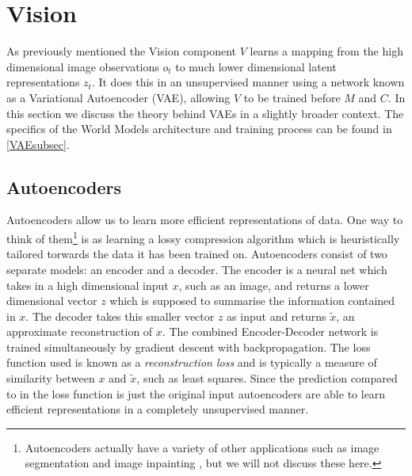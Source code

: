 \documentclass{article}
\numberwithin{figure}{section}
\theoremstyle{definition}
\begin{document}



\section{Vision}
As previously mentioned the Vision component $V$ learns a mapping from the high dimensional image observations $o_t$ to much lower dimensional latent representations $z_t$.
It does this in an unsupervised manner using a network known as a Variational Autoencoder (VAE), allowing $V$ to be trained before $M$ and $C$.
In this section we discuss the theory behind VAEs in a slightly broader context.
The specifics of the World Models architecture and training process can be found in \ref{VAEsubsec}.




\subsection{Autoencoders}
Autoencoders allow us to learn more efficient representations of data.
One way to think of them\footnote{Autoencoders actually have a variety of other applications such as image segmentation \citep{yu2020auto} and image inpainting \citep{xie2012image}, but we will not discuss these here.} is as learning a lossy compression algorithm which is heuristically tailored torwards the data it has been trained on.
Autoencoders consist of two separate models: an encoder and a decoder.
The encoder is a neural net which takes in a high dimensional input $x$, such as an image, and returns a lower dimensional vector $z$ which is supposed to summarise the information contained in $x$.
The decoder takes this smaller vector $z$ as input and returns $\widetilde{x}$, an approximate reconstruction of $x$.
The combined Encoder-Decoder network is trained simultaneously by gradient descent with backpropagation.
The loss function used is known as a \textit{reconstruction loss} and is typically a measure of similarity between $x$ and $\widetilde{x}$, such as least squares.
Since the prediction compared to in the loss function is just the original input autoencoders are able to learn efficient representations in a completely unsupervised manner.
\end{document}
